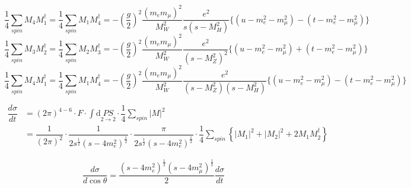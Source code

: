 \documentclass[11pt]{article}
\begin{document}
    \begin{equation}
    \frac{1}{4}\sum_{spin} M_4 M_1^{\dagger}=\frac{1}{4}\sum_{spin} M_1 M_4^{\dagger}=-\left(\frac{g}{2}\right)^2\frac{(m_em_\mu)^2}{M_W^2}\frac{e^2}{s(s-M_H^2)}\{ (u-m_e^2-m_\mu^2)-(t-m_e^2-m_\mu^2) \}
    \end{equation}
    \begin{equation}
    \frac{1}{4}\sum_{spin} M_3 M_2^{\dagger}=\frac{1}{4}\sum_{spin} M_2 M_3^{\dagger}=-\left(\frac{g}{2}\right)^2\frac{(m_em_\mu)^2}{M_W^2}\frac{e^2}{(s-M_Z^2)^2}\{ (u-m_e^2-m_\mu^2)+(t-m_e^2-m_\mu^2) \}
    \end{equation}
    \begin{equation}
    \frac{1}{4}\sum_{spin} M_4 M_1^{\dagger}=\frac{1}{4}\sum_{spin} M_1 M_4^{\dagger}=-\left(\frac{g}{2}\right)^2\frac{(m_em_\mu)^2}{M_W^2}\frac{e^2}{(s-M_Z^2)(s-M_H^2)}\{ (u-m_e^2-m_\mu^2)-(t-m_e^2-m_\mu^2) \}
    \end{equation}


    \begin{equation}
	\begin{split}
	\dfrac{d\sigma}{dt} & = \left(2\pi\right)^{4-6}\cdot F \cdot \int \mathrm{d}\underset{2\to2}{PS} \cdot \dfrac{1}{4}\sum_{spin}\lvert M\rvert^2 \\ 
	 & = \dfrac{1}{\left(2\pi\right)^{2}} \cdot \dfrac{1}{2s^{\frac{1}{2}}(s-4m_e^2)^{\frac{1}{2}} } \cdot \dfrac{\pi}{2s^{\frac{1}{2}}(s-4m_e^2)^{\frac{1}{2}} } \cdot \dfrac{1}{4}\sum_{spin}\left\{\lvert M_1\rvert^2+\lvert M_2\rvert^2+2 M_1 M_2^{\dagger}\right\}
	\end{split}
	\end{equation}

    \begin{equation}
    \frac{d\sigma}{d\cos\theta}=\frac{(s-4m_e^2)^{\frac{1}{2}}(s-4m_\mu^2)^{\frac{1}{2}}}{2}\frac{d\sigma}{dt}
    \end{equation}
\end{document}

